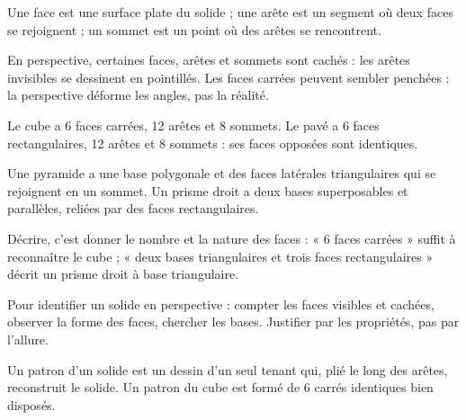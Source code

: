 \begin{propriete}Une face est une surface plate du solide ; une arête est un segment où deux faces se rejoignent ; un sommet est un point où des arêtes se rencontrent.\end{propriete}
\begin{attention}En perspective, certaines faces, arêtes et sommets sont cachés : les arêtes invisibles se dessinent en pointillés. Les faces carrées peuvent sembler penchées : la perspective déforme les angles, pas la réalité.\end{attention}
\clearpage
{}\label{cours-18-2}
\begin{propriete}Le cube a 6 faces carrées, 12 arêtes et 8 sommets. Le pavé a 6 faces rectangulaires, 12 arêtes et 8 sommets : ses faces opposées sont identiques.\end{propriete}
\begin{propriete}Une pyramide a une base polygonale et des faces latérales triangulaires qui se rejoignent en un sommet. Un prisme droit a deux bases superposables et parallèles, reliées par des faces rectangulaires.\end{propriete}
\begin{exemple}Décrire, c’est donner le nombre et la nature des faces : « 6 faces carrées » suffit à reconnaître le cube ; « deux bases triangulaires et trois faces rectangulaires » décrit un prisme droit à base triangulaire.\end{exemple}
\begin{savoirfaire}Pour identifier un solide en perspective : compter les faces visibles et cachées, observer la forme des faces, chercher les bases. Justifier par les propriétés, pas par l’allure.\end{savoirfaire}
\clearpage
{}\label{cours-18-3}
\begin{definition}Un patron d’un solide est un dessin d’un seul tenant qui, plié le long des arêtes, reconstruit le solide. Un patron du cube est formé de 6 carrés identiques bien disposés.\end{definition}
\label{fig-cours-18-3-cours-patron}

